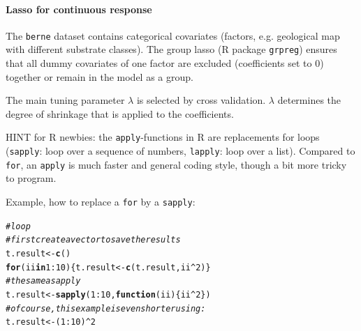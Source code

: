 \documentclass[11pt,a4paper,twoside]{article}\usepackage[]{graphicx}\usepackage[]{color}
\makeatletter
\newcommand{\hlnum}[1]{\textcolor[rgb]{0.686,0.059,0.569}{#1}}%
\newcommand{\hlcom}[1]{\textcolor[rgb]{0.678,0.584,0.686}{\textit{#1}}}%
\newcommand{\hlopt}[1]{\textcolor[rgb]{0,0,0}{#1}}%
\newcommand{\hlstd}[1]{\textcolor[rgb]{0.345,0.345,0.345}{#1}}%
\newcommand{\hlkwa}[1]{\textcolor[rgb]{0.161,0.373,0.58}{\textbf{#1}}}%
\newcommand{\hlkwb}[1]{\textcolor[rgb]{0.69,0.353,0.396}{#1}}%
\newcommand{\hlkwc}[1]{\textcolor[rgb]{0.333,0.667,0.333}{#1}}%
\newcommand{\hlkwd}[1]{\textcolor[rgb]{0.737,0.353,0.396}{\textbf{#1}}}%
\newenvironment{kframe}{%
 \def\at@end@of@kframe{}%
 \ifinner\ifhmode%
  \def\at@end@of@kframe{\end{minipage}}%
  \begin{minipage}{\columnwidth}%
 \fi\fi%
 \def\FrameCommand##1{\hskip\@totalleftmargin \hskip-\fboxsep
 \colorbox{shadecolor}{##1}\hskip-\fboxsep
     \hskip-\linewidth \hskip-\@totalleftmargin \hskip\columnwidth}%
 \MakeFramed {\advance\hsize-\width
   \@totalleftmargin\z@ \linewidth\hsize
   \@setminipage}}%
 {\par\unskip\endMakeFramed%
 \at@end@of@kframe}
\newenvironment{knitrout}{}{} %
\makeatother
\begin{document}
\paragraph{Lasso for continuous response} \mbox{}  \nolinebreak

The \texttt{berne} dataset contains categorical covariates (factors, e.g. geological map with different substrate classes). The group lasso (R package \texttt{grpreg}) ensures that all dummy covariates of one factor are excluded (coefficients set to 0) together or remain in the model as a group.

The main tuning parameter $\lambda$ is selected by cross validation. $\lambda$ determines the degree of shrinkage that is applied to the coefficients. 


\bigskip 

HINT for R newbies: the \texttt{apply}-functions in R are replacements for loops (\texttt{sapply}: loop over a sequence of numbers, \texttt{lapply}: loop over a list). Compared to \texttt{for}, an \texttt{apply} is much faster and general coding style, though a bit more tricky to program. 

Example, how to replace a \texttt{for} by a \texttt{sapply}: 
\begin{knitrout}
\color{fgcolor}\begin{kframe}
\begin{alltt}
\hlcom{# loop }
\hlcom{# first create a vector to save the results}
\hlstd{t.result} \hlkwb{<-} \hlkwd{c}\hlstd{()}
\hlkwa{for}\hlstd{( ii} \hlkwa{in} \hlnum{1}\hlopt{:}\hlnum{10} \hlstd{)\{ t.result} \hlkwb{<-} \hlkwd{c}\hlstd{(t.result, ii}\hlopt{^}\hlnum{2}\hlstd{) \}}
\hlcom{# the same as apply}
\hlstd{t.result} \hlkwb{<-} \hlkwd{sapply}\hlstd{(}\hlnum{1}\hlopt{:}\hlnum{10}\hlstd{,} \hlkwa{function}\hlstd{(}\hlkwc{ii}\hlstd{)\{ ii}\hlopt{^}\hlnum{2} \hlstd{\})}
\hlcom{# of course, this example is even shorter using:}
\hlstd{t.result} \hlkwb{<-} \hlstd{(}\hlnum{1}\hlopt{:}\hlnum{10}\hlstd{)}\hlopt{^}\hlnum{2}
\end{alltt}
\end{kframe}
\end{knitrout}
\end{document}
